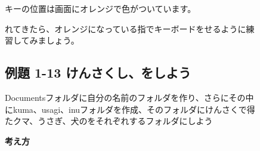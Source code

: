\begin{figure}[t]
{\begin{minipage}{5cm}
      \bigskip

      キーの位置は画面にオレンジで色がついています。


      \bigskip

      れてきたら、オレンジになっている指でキーボードをせるように練習してみましょう。


      \bigskip
    \end{minipage}
  }

  \bigskip
  \bigskip
  \bigskip
  \bigskip
\end{figure}
\clearpage



\begin{figure}[t]
  \subsection{例題 1-13 けんさくし、をしよう}
  Documentsフォルダに自分の名前のフォルダを作り、さらにその中にkuma、usagi、inuフォルダを作成、そのフォルダにけんさくで得たクマ、うさぎ、犬のをそれぞれするフォルダにしよう

  \textbf{考え方}

  \bigskip
  \centering


\end{figure}
